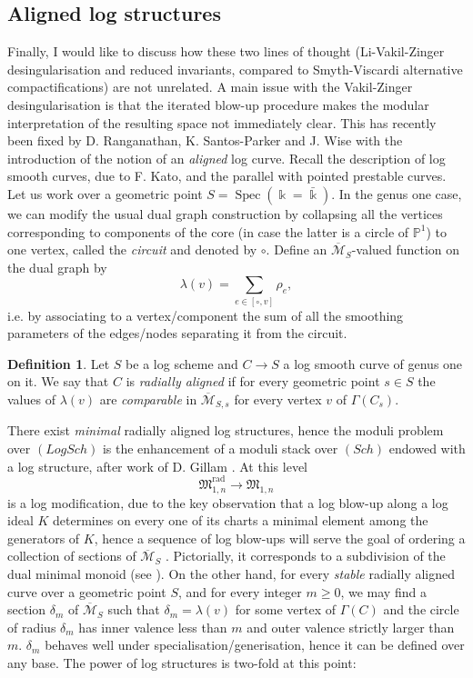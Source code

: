 \documentclass[11pt]{amsart}
\newcommand{\oM}{\overline{\mathcal{M}}}
\newcommand{\PP}{\mathbb P}
\renewcommand{\to}{\rightarrow}
\newcommand{\MM}{\mathfrak M}
\newcommand{\kk}{\Bbbk}
\newcommand{\Spec}{\operatorname{Spec}}
\theoremstyle{definition}
\theoremstyle{definition}
\newtheorem{dfn}[thm]{Definition}
\begin{document}
\subsection{Aligned log structures} Finally, I would like to discuss how these two lines of thought (Li-Vakil-Zinger desingularisation and reduced invariants, compared to Smyth-Viscardi alternative compactifications) are not unrelated. A main issue with the Vakil-Zinger desingularisation is that the iterated blow-up procedure makes the modular interpretation of the resulting space not immediately clear. This has recently been fixed by D. Ranganathan, K. Santos-Parker and J. Wise with the introduction of the notion of an \emph{aligned} log curve. Recall the description of log smooth curves, due to F. Kato\cite{KatoF}, and the parallel with pointed prestable curves. Let us work over a geometric point $S=\Spec(\kk=\bar\kk)$. In the genus one case, we can modify the usual dual graph construction by collapsing all the vertices corresponding to components of the core (in case the latter is a circle of $\PP^1$) to one vertex, called the \emph{circuit} and denoted by $\circ$. Define an $\oM_S$-valued function on the dual graph by \[\lambda(v)=\sum_{e\in[\circ,v]}\rho_e,\] i.e. by associating to a vertex/component the sum of all the smoothing parameters of the edges/nodes separating it from the circuit.
\begin{dfn}
 Let $S$ be a log scheme and $C\to S$ a log smooth curve of genus one on it. We say that $C$ is \emph{radially aligned} if for every geometric point $s\in S$ the values of $\lambda(v)$ are \emph{comparable} in $\oM_{S,s}$ for every vertex $v$ of $\Gamma(C_s)$.
\end{dfn}
There exist \emph{minimal} radially aligned log structures, hence the moduli problem over $(LogSch)$ is the enhancement of a moduli stack over $(Sch)$ endowed with a log structure, after work of D. Gillam \cite{Gillam}. At this level
\[\MM^{\mathrm{rad}}_{1,n}\to\MM_{1,n}\]
is a log modification, due to the key observation that a log blow-up along a log ideal $K$ determines on every one of its charts a minimal element among the generators of $K$, hence a sequence of log blow-ups will serve the goal of ordering a collection of sections of $\oM_S$ \cite[Lemma 3.36]{Kelithesis}. Pictorially, it corresponds to a subdivision of the dual minimal monoid (see \cite[\S 3.3-3.4]{RSPW}). On the other hand, for every \emph{stable} radially aligned curve over a geometric point $S$, and for every integer $m\geq0$, we may find a section $\delta_m$ of $\oM_S$ such that $\delta_m=\lambda(v)$ for some vertex of $\Gamma(C)$ and the circle of radius $\delta_m$ has inner valence less than $m$ and outer valence strictly larger than $m$. $\delta_m$ behaves well under specialisation/generisation, hence it can be defined over any base. The power of log structures is two-fold at this point:
\end{document}

